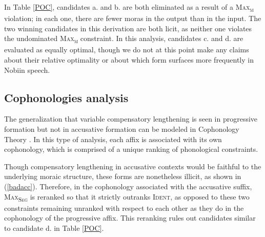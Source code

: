 \documentclass[output=paper]{langscibook}
\begin{document}
In Table \ref{POC}, candidates a. and b. are both eliminated as a result of a \textsc{Max\textsubscript{μ}} violation; in each one, there are fewer moras in the output than in the input. The two winning candidates in this derivation are both licit, as neither one violates the undominated \textsc{Max\textsubscript{μ}} constraint. In this analysis, candidates c. and d. are evaluated as equally optimal, though we do not at this point make any claims about their relative optimality or about which form surfaces more frequently in Nobiin speech.

\subsection{Cophonologies analysis}
The generalization that variable compensatory lengthening is seen in progressive formation but not in accusative formation can be modeled in Cophonology Theory \citep{anttilaCT, inkelaszollCT}. In this type of analysis, each affix is associated with its own cophonology, which is comprised of a unique ranking of phonological constraints. 

Though compensatory lengthening in accusative contexts would be faithful to the underlying moraic structure, these forms are nonetheless illicit, as shown in (\ref{badacc}). Therefore, in the cophonology associated with the accusative suffix, \textsc{Max\textsubscript{Seg}} is reranked so that it strictly outranks \textsc{Ident}, as opposed to these two constraints remaining unranked with respect to each other as they do in the cophonology of the progressive affix. This reranking rules out candidates similar to candidate d. in Table \ref{POC}.


\end{document}
